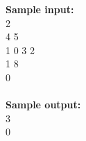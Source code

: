 \documentclass[11pt]{article}
\begin{document}
\begin{enumerate}
\textbf{Sample input:}
\\
2\\
4 5\\
1 0 3 2\\
1 8\\
0
\\
\\
\textbf{Sample output:}
\\
3\\
0\\
\\


\end{enumerate}
\end{document}
